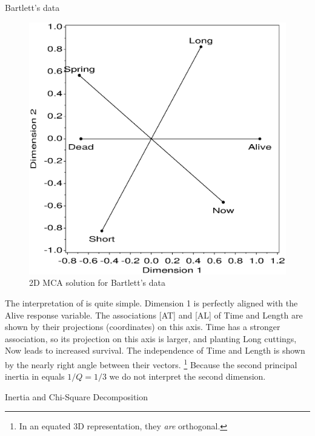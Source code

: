 \begin{Example}[bartlett]{Bartlett's data}
\begin{figure}[htb]
  \centering
  \includegraphics[scale=.7,clip]{ch5/fig/mcabart1}
  \caption{2D MCA solution for Bartlett's data}\label{fig:mcabart1}
\end{figure}

The interpretation of  is quite simple.
Dimension 1 is perfectly aligned with the Alive response variable.
The associations [AT] and [AL] of Time and Length are shown by their projections
(coordinates) on this axis.
Time has a stronger association, so its projection on this axis is larger,
and planting Long cuttings, Now leads to increased survival.
The independence of Time and Length is shown by the nearly
right angle between their vectors.%
\footnote{In an equated 3D representation, they \emph{are} orthogonal.}
Because the second principal inertia in 
equals $1/Q = 1/3$ we do not interpret the second dimension.
\begin{Output}[htb]
\caption{Chi-Square Decomposition for Bartlett's data, MCA}\label{out:mcabart1}
\begin{output}
                      Inertia and Chi-Square Decomposition


\end{output}
\end{Output}
\end{Example}
